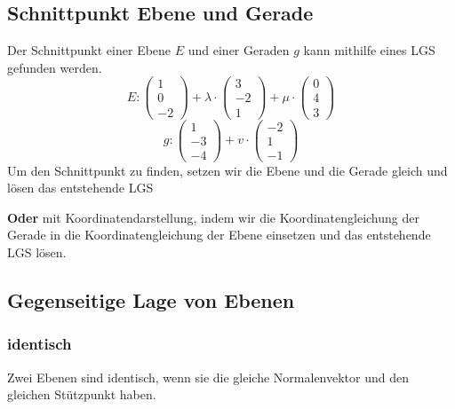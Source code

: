 \documentclass{article}
\begin{document}
\hfill
\begin{minipage}[t]{0.45\textwidth}
    \subsection*{Schnittpunkt Ebene und Gerade}
    Der Schnittpunkt einer Ebene \( E \) und einer Geraden \( g \) kann mithilfe eines LGS gefunden werden. 
    \begin{equation*}
        E: \begin{pmatrix}
            1 \\
            0 \\
            -2
        \end{pmatrix} + \lambda \cdot \begin{pmatrix}
            3 \\
            -2 \\
            1
        \end{pmatrix} + \mu \cdot \begin{pmatrix}
            0 \\
            4 \\
            3
        \end{pmatrix}
    \end{equation*}
    \begin{equation*}
        g: \begin{pmatrix}
            1 \\
            -3 \\
            -4
            \end{pmatrix} + v \cdot \begin{pmatrix}
                -2 \\
                1 \\
                -1
            \end{pmatrix}
    \end{equation*}
    Um den Schnittpunkt zu finden, setzen wir die Ebene und die Gerade gleich und lösen das entstehende LGS

    \textbf{Oder} mit Koordinatendarstellung, indem wir die Koordinatengleichung der Gerade in die Koordinatengleichung der Ebene einsetzen und das entstehende LGS lösen.

    \subsection*{Gegenseitige Lage von Ebenen}
    \subsubsection*{identisch}
    Zwei Ebenen sind identisch, wenn sie die gleiche Normalenvektor und den gleichen Stützpunkt haben.


\end{minipage}
\end{document}
